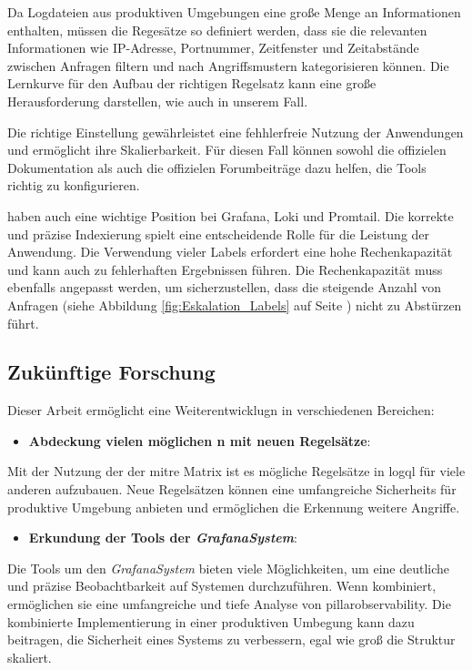 Da Logdateien aus produktiven Umgebungen eine große Menge an Informationen enthalten, müssen die Regesätze so definiert werden, dass sie die relevanten Informationen wie IP-Adresse, Portnummer, Zeitfenster und Zeitabstände zwischen Anfragen filtern und nach Angriffsmustern kategorisieren können. Die Lernkurve für den Aufbau der richtigen Regelsatz kann eine große Herausforderung darstellen, wie auch in unserem Fall.

Die richtige Einstellung gewährleistet eine fehhlerfreie Nutzung der Anwendungen und ermöglicht ihre Skalierbarkeit. Für diesen Fall können sowohl die offizielen Dokumentation als auch die offizielen Forumbeiträge dazu helfen, die Tools richtig zu konfigurieren.

 haben auch eine wichtige Position bei Grafana, Loki und Promtail. Die korrekte und präzise Indexierung spielt eine entscheidende Rolle für die Leistung der Anwendung. Die Verwendung vieler Labels erfordert eine hohe Rechenkapazität und kann auch zu fehlerhaften Ergebnissen führen. Die Rechenkapazität muss ebenfalls angepasst werden, um sicherzustellen, dass die steigende Anzahl von Anfragen (siehe Abbildung \ref{fig:Eskalation_Labels} auf Seite \pageref{fig:Eskalation_Labels}) nicht zu Abstürzen führt.

\subsection{Zukünftige Forschung}
Dieser Arbeit ermöglicht eine Weiterentwicklugn in verschiedenen Bereichen:
 
\begin{itemize}[noitemsep]
    \item \textbf{Abdeckung vielen möglichen n mit neuen Regelsätze}:
\end{itemize}

Mit der Nutzung der  der \gls{mitre} Matrix ist es mögliche Regelsätze in \gls{logql} für viele anderen  aufzubauen. Neue Regelsätzen können eine umfangreiche Sicherheits für produktive Umgebung anbieten und ermöglichen die Erkennung weitere Angriffe.

\begin{itemize}[noitemsep]
    \item \textbf{Erkundung der Tools der \textit{\gls{GrafanaSystem}}}:
\end{itemize}

Die Tools um den \textit{\gls{GrafanaSystem}} bieten viele Möglichkeiten, um eine deutliche und präzise Beobachtbarkeit auf Systemen durchzuführen. Wenn kombiniert, ermöglichen sie eine umfangreiche und tiefe Analyse von \gls{pillarobservability}. Die kombinierte Implementierung in einer produktiven Umbegung kann dazu beitragen, die Sicherheit eines Systems zu verbessern, egal wie groß die Struktur skaliert.

